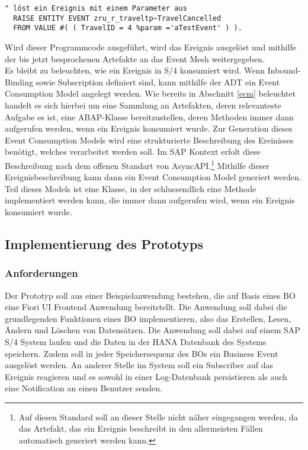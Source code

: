 \begin{lstlisting}[language=ABAP]
  " löst ein Ereignis mit einem Parameter aus
  RAISE ENTITY EVENT zru_r_traveltp~TravelCancelled
  FROM VALUE #( ( TravelID = 4 %param ='aTestEvent' ) ).
\end{lstlisting}

Wird dieser Programmcode ausgeführt, wird das Ereignis ausgelöst und mithilfe der bis jetzt besprochenen Artefakte an das Event Mesh weitergegeben.\\

Es bleibt zu beleuchten, wie ein Ereignis in S/4 konsumiert wird. Wenn Inbound-Binding sowie Subscription definiert sind, kann mithilfe der \ac{ADT} ein Event Consumption Model angelegt werden. Wie bereits in Abschnitt \ref{ecm} beleuchtet handelt es sich hierbei um eine Sammlung an Artefakten, deren relevanteste Aufgabe es ist, eine \ac{ABAP}-Klasse bereitzustellen, deren Methoden immer dann aufgerufen werden, wenn ein Ereignis konsumiert wurde. Zur Generation dieses Event Consumption Models wird eine strukturierte Beschreibung des Ereinisses benötigt, welches verarbeitet werden soll. Im SAP Kontext erfolt diese Beschreibung nach dem offenen Standart von AsyncAPI.\footnote{Auf diesen Standard soll an dieser Stelle nicht näher eingegangen werden, da das Artefakt, das ein Ereignis beschreibt in den allermeisten Fällen automatisch generiert werden kann.} Mithilfe dieser Ereignisbeschreibung kann dann ein Event Consumption Model generiert werden. Teil dieses Models ist eine Klasse, in der schlussendlich eine Methode implementiert werden kann, die immer dann aufgerufen wird, wenn ein Ereignis konsumiert wurde.\\

\subsection{Implementierung des Prototyps}
\subsubsection*{Anforderungen}
Der Prototyp soll aus einer Beispielanwendung bestehen, die auf Basis eines \ac{BO} eine Fiori UI Frontend Anwendung bereitstellt. Die Anwendung soll dabei die grundlegenden Funktionen eines \ac{BO} implementieren, also das Erstellen, Lesen, Ändern und Löschen von Datensätzen. Die Anwendung soll dabei auf einem SAP S/4 System laufen und die Daten in der HANA Datenbank des Systems speichern. Zudem soll in jeder Speichersequenz des \ac{BO}s ein Business Event ausgelöst werden. An anderer Stelle im System soll ein Subscriber auf das Ereignis reagieren und es sowohl in einer Log-Datenbank persistieren als auch eine Notification an einen Benutzer senden.
